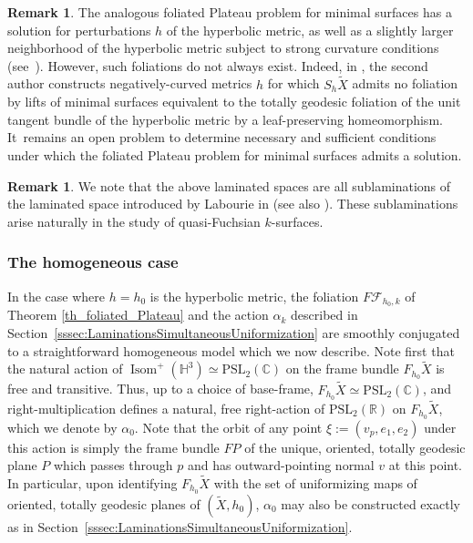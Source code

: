 \documentclass[10pt]{amsart}
\newcommand{\ksurfaces}{$k$\nobreakdash-surfaces\xspace}
\theoremstyle{plain}
\theoremstyle{definition}
\newtheorem{remark}[theorem]{Remark}
\newcommand\PSL{\mathrm{PSL}_2(\mathbb{R})}
\newcommand\PSLc{\mathrm{PSL}_2(\mathbb{C})}
\newcommand\Hyp{\mathbb{H}^3}
\newcommand{\cF}{{\mathcal F}}
\DeclareMathOperator{\Isom}{Isom}
\begin{document}
\begin{remark}
The analogous foliated Plateau problem for minimal surfaces has a solution for perturbations $h$ of the hyperbolic metric, as well as a slightly larger neighborhood of the hyperbolic metric subject to strong curvature conditions (see~\hbox{\cite{Gromov_FolPlateau1,LoweGAFA}}). However, such foliations do not always exist. Indeed, in \cite{LoweGAFA}, the second author constructs negatively-curved metrics $h$ for which $S_h\tilde{X}$ admits no foliation by lifts of minimal surfaces equivalent to the totally geodesic foliation of the unit tangent bundle of the hyperbolic metric by a leaf-preserving homeomorphism. It~remains an open problem to determine necessary and sufficient conditions under which the foliated Plateau problem for minimal surfaces admits a solution.
\end{remark}

\begin{remark}We note that the above laminated spaces are all sublaminations of the laminated space introduced by Labourie in \cite{LabourieGAFA,LabourieInvent,LabourieAnnals} (see also \cite{Smith_asymp}). These sublaminations arise naturally in the study of quasi-Fuchsian \ksurfaces.
\end{remark}

\subsubsection{The homogeneous case}
In the case where $h=h_0$ is the hyperbolic metric, the foliation $F\cF_{h_0,k}$ of Theorem \ref{th_foliated_Plateau} and the action $\alpha_k$ described in Section~\ref{sssec:LaminationsSimultaneousUniformization} are smoothly conjugated to a straightforward homogeneous model which we now describe. Note first that the natural action of $\Isom^+(\Hyp)\simeq\PSLc$ on the frame bundle $F_{h_0}\tilde{X}$ is free and transitive. Thus, up to a choice of base-frame, $F_{h_0}\tilde{X}\simeq\PSLc$, and right-multiplication defines a natural, free right-action of $\PSL$ on $F_{h_0}\tilde{X}$, which we denote by $\alpha_0$. Note that the orbit of any point $\xi:=(v_p,e_1,e_2)$ under this action is simply the frame bundle $FP$ of the unique, oriented, totally geodesic plane $P$ which passes through $p$ and has outward-pointing normal $v$ at this point. In particular, upon identifying $F_{h_0}\tilde{X}$ with the set of uniformizing maps of oriented, totally geodesic planes of $(\tilde{X},h_0)$, $\alpha_0$ may also be constructed exactly as in Section~\ref{sssec:LaminationsSimultaneousUniformization}.
\end{document}
